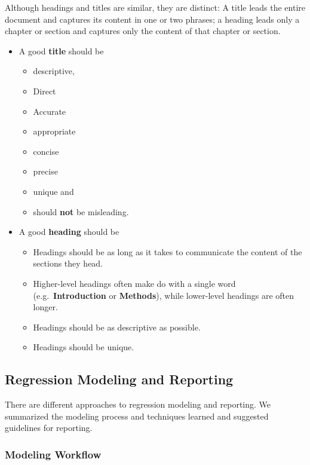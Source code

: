 \documentclass[
]{book}
\providecommand{\tightlist}{%
  \setlength{\itemsep}{0pt}\setlength{\parskip}{0pt}}
\begin{document}
Although headings and titles are similar, they are distinct: A title leads the entire document and captures its content in one or two phrases; a heading leads only a chapter or section and captures only the content of that chapter or section.

\begin{itemize}
\tightlist
\item
  A good \textbf{title} should be

  \begin{itemize}
  \tightlist
  \item
    descriptive,
  \item
    Direct
  \item
    Accurate
  \item
    appropriate
  \item
    concise
  \item
    precise
  \item
    unique and
  \item
    should \textbf{not} be misleading.
  \end{itemize}
\item
  A good \textbf{heading} should be

  \begin{itemize}
  \tightlist
  \item
    Headings should be as long as it takes to communicate the content of the sections they head.
  \item
    Higher-level headings often make do with a single word (e.g.~\textbf{Introduction} or \textbf{Methods}), while lower-level headings are often longer.
  \item
    Headings should be as descriptive as possible.
  \item
    Headings should be unique.
  \end{itemize}
\end{itemize}

\hypertarget{regression-modeling-and-reporting}{%
\subsection{Regression Modeling and Reporting}\label{regression-modeling-and-reporting}}

There are different approaches to regression modeling and reporting. We summarized the modeling process and techniques learned and suggested guidelines for reporting.

\hypertarget{modeling-workflow}{%
\subsubsection{Modeling Workflow}\label{modeling-workflow}}
\end{document}
